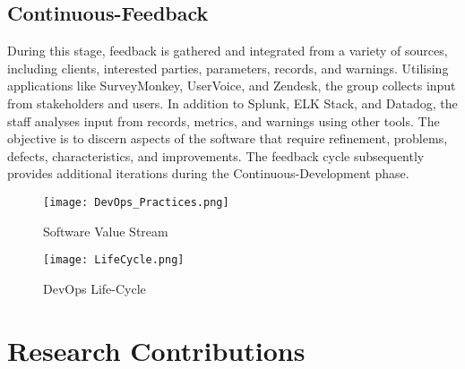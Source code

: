 \documentclass[12pt, letterpaper]{article}
\begin{document}
\subsection{Continuous-Feedback}
During this stage, feedback is gathered and integrated from a variety of sources, including clients, interested parties, parameters, records, and warnings. Utilising applications like SurveyMonkey, UserVoice, and Zendesk, the group collects input from stakeholders and users. In addition to Splunk, ELK Stack, and Datadog, the staff analyses input from records, metrics, and warnings using other tools. The objective is to discern aspects of the software that require refinement, problems, defects, characteristics, and improvements. The feedback cycle subsequently provides additional iterations during the Continuous-Development phase\cite{hasselbring2019industrial}.

\begin{figure}
    \centering
    \texttt{[image: DevOps\_Practices.png]}
    \caption{Software Value Stream}
\end{figure}
\begin{figure}
    \centering
    \texttt{[image: LifeCycle.png]}
    \caption{DevOps Life-Cycle}
\end{figure}

\section{Research Contributions}


\end{document}
